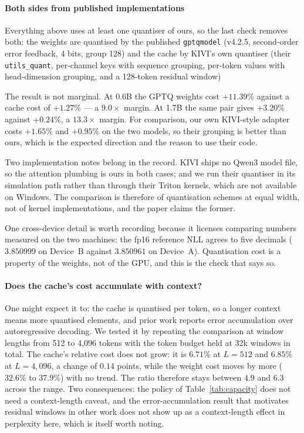 \documentclass[5p]{elsarticle}
\begin{document}
\paragraph*{Both sides from published implementations}
Everything above uses at least one quantiser of ours, so the last check removes
both: the weights are quantised by the published \texttt{gptqmodel} (v4.2.5,
second-order error feedback, 4 bits, group 128) and the cache by KIVI's own
quantiser (their \texttt{utils\_quant}, per-channel keys with sequence grouping,
per-token values with head-dimension grouping, and a 128-token residual window)

The result is not marginal. At 0.6B the GPTQ weights cost $+11.39\%$ against a
cache cost of $+1.27\%$ --- a $9.0\times$ margin. At 1.7B the same pair gives
$+3.20\%$ against $+0.24\%$, a $13.3\times$ margin. For comparison, our own
KIVI-style adapter costs $+1.65\%$ and $+0.95\%$ on the two models, so their
grouping is better than ours, which is the expected direction and the reason to
use their code.

Two implementation notes belong in the record. KIVI ships no Qwen3 model file, so
the attention plumbing is ours in both cases; and we run their quantiser in its
simulation path rather than through their Triton kernels, which are not available
on Windows. The comparison is therefore of quantisation schemes at equal width,
not of kernel implementations, and the paper claims the former.

One cross-device detail is worth recording because it licenses comparing numbers
measured on the two machines: the fp16 reference NLL agrees to five decimals
($3.850999$ on Device~B against $3.850961$ on Device~A). Quantisation cost is a
property of the weights, not of the GPU, and this is the check that says so.

\paragraph*{Does the cache's cost accumulate with context?}
One might expect it to: the cache is quantised per token, so a longer context
means more quantised elements, and prior work reports error accumulation over
autoregressive decoding. We tested it by repeating the comparison at window
lengths from 512 to 4{,}096 tokens with the token budget held at 32k windows in
total. The cache's relative cost does not grow: it is $6.71\%$ at $L{=}512$ and
$6.85\%$ at $L{=}4{,}096$, a change of $0.14$ points, while the weight cost moves
by more ($32.6\%$ to $37.9\%$) with no trend. The ratio therefore stays between
$4.9$ and $6.3$ across the range. Two consequences: the policy of
Table~\ref{tab:capacity} does not need a context-length caveat, and the
error-accumulation result that motivates residual windows in other work does not
show up as a context-length effect in perplexity here, which is itself worth
noting.
\end{document}
